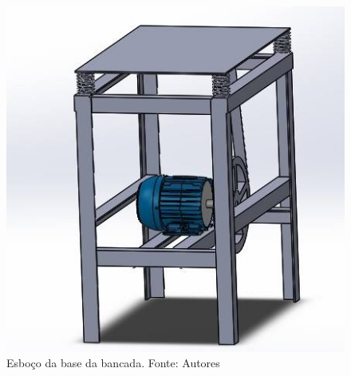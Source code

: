 \begin{figure}[!ht]
\centering
\includegraphics[scale=0.5]{figuras/motor_catia.jpg}
\caption{Esboço da base da bancada. Fonte: Autores}
\label{fig:motor_catia}
\end{figure}
